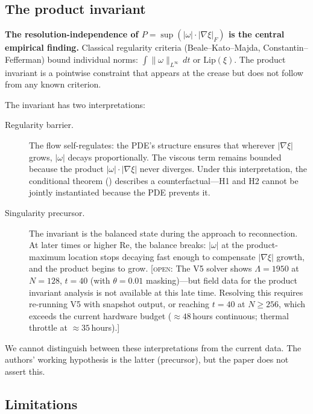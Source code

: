 \documentclass[11pt,a4paper]{article}
\theoremstyle{definition}
\newcommand{\Lip}{\mathrm{Lip}}
\newcommand{\grad}{\nabla}
\newcommand{\norm}[1]{\lVert #1 \rVert}
\newcommand{\abs}[1]{\lvert #1 \rvert}
\newcommand{\Rey}{\mathrm{Re}}
\newcommand{\strongclaim}[1]{\textbf{#1}}  %
\newcommand{\openquestion}[1]{%
  \textcolor{black!70}{[\textsc{open}: #1]}}
\begin{document}
\subsection{The product invariant}\label{sec:invariant-discussion}

\strongclaim{The resolution-independence of
$P=\sup(\abs{\omega}\cdot\abs{\grad\xi}_F)$ is the central
empirical finding.}  Classical regularity criteria
(Beale--Kato--Majda, Constantin--Fefferman) bound individual norms:
$\int\norm{\omega}_{L^\infty}\,dt$ or $\Lip(\xi)$.  The product
invariant is a pointwise constraint that appears at the crease but
does not follow from any known criterion.

The invariant has two interpretations:

\begin{description}
\item[Regularity barrier.] The flow self-regulates: the PDE's
  structure ensures that wherever $\abs{\grad\xi}$ grows, $\abs{\omega}$
  decays proportionally.  The viscous term remains bounded because the
  product $\abs{\omega}\cdot\abs{\grad\xi}$ never diverges.  Under
  this interpretation, the conditional theorem
  () describes a counterfactual---H1 and H2 cannot
  be jointly instantiated because the PDE prevents it.

\item[Singularity precursor.] The invariant is the balanced state
  during the approach to reconnection.  At later times or higher $\Rey$,
  the balance breaks: $\abs{\omega}$ at the product-maximum location
  stops decaying fast enough to compensate $\abs{\grad\xi}$ growth,
  and the product begins to grow.  \openquestion{The V5 solver shows
  $\Lambda=1950$ at $N{=}128$, $t{=}40$ (with $\theta{=}0.01$
  masking)---but field data for the product invariant analysis is not
  available at this late time.  Resolving this requires re-running V5
  with snapshot output, or reaching $t{=}40$ at $N{\geq}256$, which
  exceeds the current hardware budget (${\approx}48$\,hours continuous;
  thermal throttle at ${\approx}35$\,hours).}
\end{description}

We cannot distinguish between these interpretations from the current
data.  The authors' working hypothesis is the latter (precursor), but
the paper does not assert this.

\subsection{Limitations}\label{sec:limitations}
\end{document}
